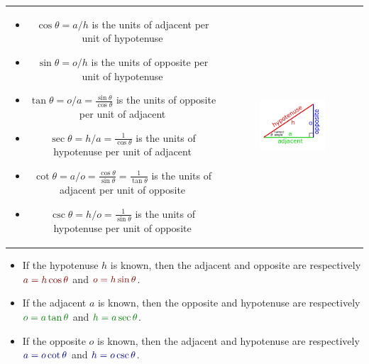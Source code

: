 \documentclass{article}
\newcommand{\dr}[1]{\textcolor{dark_red}{#1}}
\newcommand{\dg}[1]{\textcolor{dark_green}{#1}}
\newcommand{\db}[1]{\textcolor{dark_blue}{#1}}
\begin{document}
\begin{tabular}{cc}
\parbox{0.5\textwidth}{
\begin{itemize}
\item \dr{\(\cos\theta = a/h\)} is the units of adjacent per unit of hypotenuse
\item \dr{\(\sin\theta = o/h\)} is the units of opposite per unit of hypotenuse
\item \dg{\(\tan\theta = o/a = \frac{\sin\theta}{\cos\theta}\)} is the units of opposite per unit of adjacent
\item \dg{\(\sec\theta = h/a = \frac{1}{\cos\theta}\)} is the units of hypotenuse per unit of adjacent
\item \db{\(\cot\theta = a/o = \frac{\cos\theta}{\sin\theta} = \frac{1}{\tan\theta}\)} is the units of adjacent per unit of opposite
\item \db{\(\csc\theta = h/o = \frac{1}{\sin\theta}\)} is the units of hypotenuse per unit of opposite
\end{itemize}
} & \parbox{0.5\textwidth}{
\includegraphics[width = 0.5\textwidth]{sides_of_a_right_triangle}
}
\end{tabular}

\begin{itemize}
\item If the hypotenuse \(h\) is known, then the adjacent and opposite are respectively \(\dr{a = h\cos\theta}\) and \(\dr{o = h\sin\theta}\).
\item If the adjacent \(a\) is known, then the opposite and hypotenuse are respectively \(\dg{o = a\tan\theta}\) and \(\dg{h = a\sec\theta}\).
\item If the opposite \(o\) is known, then the adjacent and hypotenuse are respectively \(\db{a = o\cot\theta}\) and \(\db{h = o\csc\theta}\).
\end{itemize}
\end{document}
